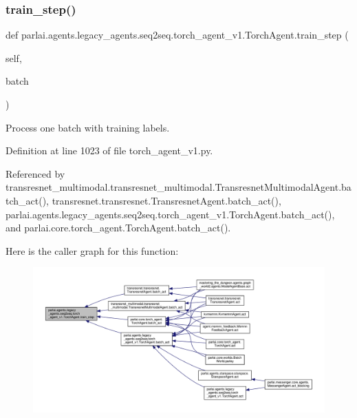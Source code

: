 \subsubsection{\texorpdfstring{train\+\_\+step()}{train\_step()}}
{\footnotesize\ttfamily def parlai.\+agents.\+legacy\+\_\+agents.\+seq2seq.\+torch\+\_\+agent\+\_\+v1.\+Torch\+Agent.\+train\+\_\+step (\begin{DoxyParamCaption}\item[{}]{self,  }\item[{}]{batch }\end{DoxyParamCaption})}

\begin{DoxyVerb}Process one batch with training labels.\end{DoxyVerb}
 

Definition at line 1023 of file torch\+\_\+agent\+\_\+v1.\+py.



Referenced by transresnet\+\_\+multimodal.\+transresnet\+\_\+multimodal.\+Transresnet\+Multimodal\+Agent.\+batch\+\_\+act(), transresnet.\+transresnet.\+Transresnet\+Agent.\+batch\+\_\+act(), parlai.\+agents.\+legacy\+\_\+agents.\+seq2seq.\+torch\+\_\+agent\+\_\+v1.\+Torch\+Agent.\+batch\+\_\+act(), and parlai.\+core.\+torch\+\_\+agent.\+Torch\+Agent.\+batch\+\_\+act().

Here is the caller graph for this function\+:
\nopagebreak
\begin{figure}[H]
\begin{center}
\leavevmode
\includegraphics[width=350pt]{classparlai_1_1agents_1_1legacy__agents_1_1seq2seq_1_1torch__agent__v1_1_1TorchAgent_aff9cc5c105bbf154075aa83e288582ca_icgraph}
\end{center}
\end{figure}
\mbox{\label{classparlai_1_1agents_1_1legacy__agents_1_1seq2seq_1_1torch__agent__v1_1_1TorchAgent_a866838e1c81063a3ec18c5609e029f90}} 
